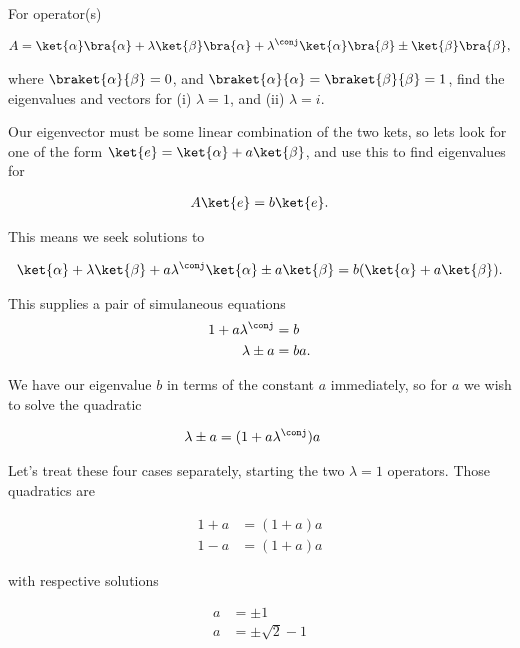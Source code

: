 For operator(s)

\begin{align}\label{eqn:desaiDiracNotes:60}
A = 
\ket{\alpha}\bra{\alpha}
+ \lambda \ket{\beta}\bra{\alpha}
+ \lambda^\conj \ket{\alpha}\bra{\beta}
\pm \ket{\beta}\bra{\beta},
\end{align}

where $\braket{\alpha}{\beta} = 0$, and $\braket{\alpha}{\alpha} = \braket{\beta}{\beta} = 1$, find the eigenvalues and vectors for (i) $\lambda = 1$, and (ii) $\lambda = i$.

Our eigenvector must be some linear combination of the two kets, so lets look for one of the form $\ket{e} = \ket{\alpha} + a\ket{\beta}$, and use this to find eigenvalues for

\begin{align}\label{eqn:desaiDiracNotes:61}
A \ket{e} = b \ket{e}.
\end{align}

This means we seek solutions to

\begin{align}\label{eqn:desaiDiracNotes:62}
\ket{\alpha}
+ \lambda \ket{\beta}
+ a \lambda^\conj \ket{\alpha}
\pm a \ket{\beta}
= b ( \ket{\alpha} + a \ket{\beta} ).
\end{align}

This supplies a pair of simulaneous equations
\begin{align}\label{eqn:desaiDiracNotes:63}
1 + a \lambda^\conj &= b \\
\lambda \pm a &= b a.
\end{align}

We have our eigenvalue $b$ in terms of the constant $a$ immediately, so for $a$ we wish to solve the quadratic

\begin{align}\label{eqn:desaiDiracNotes:64}
\lambda \pm a &= (1 + a \lambda^\conj ) a
\end{align}

Let's treat these four cases separately, starting the two $\lambda = 1$ operators.  Those quadratics are

\begin{align}\label{eqn:desaiDiracNotes:65}
1 + a &= (1 + a ) a \\
1 - a &= (1 + a ) a
\end{align}

with respective solutions

\begin{align}\label{eqn:desaiDiracNotes:66}
a &= \pm 1 \\
a &= \pm \sqrt{2} - 1
\end{align}

